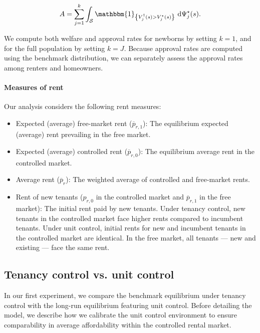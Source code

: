 \documentclass[parskip=full]{article}
\newcommand{\indicator}[1]{\mathbbm{1}_{\left\{ {#1} \right\} }}
\begin{document}
\begin{equation}
A = \sum_{j=1}^{k}\int_{\mathcal{S}} \indicator{V^{\dagger}_{j}(s)>V^{\star}_{j}(s)}\ \mathrm{d}\Psi^{\star}_{j}(s).
\end{equation}

\noindent We compute both welfare and approval rates for newborns by setting $k=1$, and for the full population by setting $k=J$. Because approval rates are computed using the benchmark distribution, we can separately assess the approval rates among renters and homeowners. 

\paragraph{Measures of rent} Our analysis considers the following rent measures:

\begin{itemize}
    \item Expected (average) free-market rent ($\overline{p}_{r,1}$): The equilibrium expected (average) rent prevailing in the free market.
    \item Expected (average) controlled rent ($\overline{p}_{r,0}$): The equilibrium average rent in the controlled market.
    \item Average rent ($\overline{p}_{r}$): The weighted average of controlled and free-market rents.
    \item Rent of new tenants ($p_{r,0}$ in the controlled market and $\overline{p}_{r,1}$ in the free market): The initial rent paid by new tenants. Under tenancy control, new tenants in the controlled market face higher rents compared to incumbent tenants. Under unit control, initial rents for new and incumbent tenants in the controlled market are identical. In the free market, all tenants — new and existing — face the same rent.
\end{itemize}

\subsection{Tenancy control vs. unit control}\label{sec:unit_control_comparison}

In our first experiment, we compare the benchmark equilibrium under tenancy control with the long-run equilibrium featuring unit control. Before detailing the model, we describe how we calibrate the unit control environment to ensure comparability in average affordability within the controlled rental market.
\end{document}
